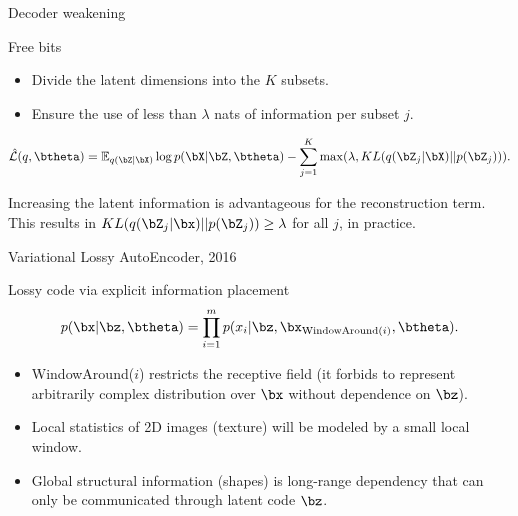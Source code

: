 \begin{frame}{Decoder weakening}
	\begin{block}{Free bits}
	\begin{itemize}
	\item Divide the latent dimensions into the $K$ subsets.
	\item Ensure the use of less than $\lambda$ nats of information per subset $j$.
	\end{itemize}
	
	\[
	    \hat{\mathcal{L}}(q, \btheta) = \mathbb{E}_{q(\bZ | \bX)} \log p(\bX | \bZ, \btheta) - \sum_{j=1}^K \max(\lambda, KL (q(\bZ_j | \bX) || p(\bZ_j))).
	\]
	
	Increasing the latent information is advantageous for the reconstruction term. \\
	\vspace{0.2cm}
	This results in $KL (q(\bZ_j | \bx) || p(\bZ_j)) \geq \lambda$ for all $j$, in practice.
	\end{block}
\end{frame}
\begin{frame}{Variational Lossy AutoEncoder, 2016}
	\begin{block}{Lossy code via explicit information placement}
	\[
	    p(\bx | \bz, \btheta) = \prod_{i=1}^m p(x_i | \bz, \bx_{\text{WindowAround}(i)}, \btheta).
	\]
	\begin{itemize}
	    \item WindowAround($i$) restricts the receptive field (it forbids to represent arbitrarily complex distribution over $\bx$ without dependence on $\bz$). 
	    \item Local statistics of 2D images (texture) will be modeled by a small local window.
	    \item Global structural information (shapes) is long-range dependency that can only be communicated through latent code $\bz$. 
	\end{itemize}
	\end{block}
\end{frame}
